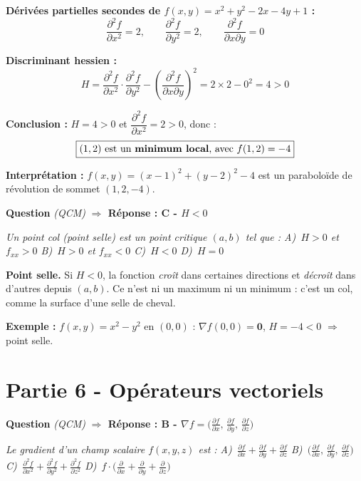 \documentclass[11pt,a4paper]{article}
\newcounter{qnum}
\newcommand{\qtitre}[2]{%
  \stepcounter{qnum}%
  \medskip\noindent
  \textbf{\color{bleutexte}Question \theqnum}\enspace
  \textit{(#1)}\enspace
  \textcolor{vertok}{\textbf{$\Rightarrow$ Réponse : #2}}
  \par\smallskip
}
\newcommand{\qenonce}[1]{%
  \begin{mdframed}[backgroundcolor=grisbox, linewidth=0pt,
    innerleftmargin=8pt, innerrightmargin=8pt,
    innertopmargin=5pt, innerbottommargin=5pt,
    skipabove=2pt, skipbelow=4pt]
  \small\textit{#1}
  \end{mdframed}
}
\begin{document}
\begin{reponsebox}
\textbf{Dérivées partielles secondes de $f(x,y) = x^2+y^2-2x-4y+1$ :}
$$\frac{\partial^2 f}{\partial x^2} = 2, \qquad \frac{\partial^2 f}{\partial y^2} = 2, \qquad \frac{\partial^2 f}{\partial x\partial y} = 0$$

\textbf{Discriminant hessien :}
$$H = \frac{\partial^2 f}{\partial x^2}\cdot\frac{\partial^2 f}{\partial y^2} - \left(\frac{\partial^2 f}{\partial x\partial y}\right)^2 = 2\times 2 - 0^2 = 4 > 0$$

\textbf{Conclusion :} $H = 4 > 0$ et $\dfrac{\partial^2 f}{\partial x^2} = 2 > 0$, donc :
$$\boxed{(1,2) \text{ est un \textbf{minimum local}, avec } f(1,2) = -4}$$

\textbf{Interprétation :} $f(x,y) = (x-1)^2 + (y-2)^2 - 4$ est un paraboloïde de révolution de sommet $(1,2,-4)$.
\end{reponsebox}

\qtitre{QCM}{C - $H < 0$}
\qenonce{Un point col (point selle) est un point critique $(a,b)$ tel que :
\quad A)~$H>0$ et $f_{xx}>0$
\quad B)~$H>0$ et $f_{xx}<0$
\quad C)~$H < 0$
\quad D)~$H = 0$}

\begin{methodebox}
\textbf{Point selle.} Si $H < 0$, la fonction \emph{croît} dans certaines directions et \emph{décroît} dans d'autres depuis $(a,b)$. Ce n'est ni un maximum ni un minimum : c'est un col, comme la surface d'une selle de cheval.
\end{methodebox}

\textbf{Exemple :} $f(x,y) = x^2 - y^2$ en $(0,0)$ : $\nabla f(0,0) = \mathbf{0}$, $H = -4 < 0$ $\Rightarrow$ point selle.

\section{Partie 6 - Opérateurs vectoriels}

\qtitre{QCM}{B - $\nabla f = \bigl(\frac{\partial f}{\partial x},\,\frac{\partial f}{\partial y},\,\frac{\partial f}{\partial z}\bigr)$}
\qenonce{Le gradient d'un champ scalaire $f(x,y,z)$ est :
\quad A)~$\frac{\partial f}{\partial x}+\frac{\partial f}{\partial y}+\frac{\partial f}{\partial z}$
\quad B)~$\bigl(\frac{\partial f}{\partial x},\,\frac{\partial f}{\partial y},\,\frac{\partial f}{\partial z}\bigr)$
\quad C)~$\frac{\partial^2 f}{\partial x^2}+\frac{\partial^2 f}{\partial y^2}+\frac{\partial^2 f}{\partial z^2}$
\quad D)~$f\cdot\bigl(\frac{\partial}{\partial x}+\frac{\partial}{\partial y}+\frac{\partial}{\partial z}\bigr)$}
\end{document}
